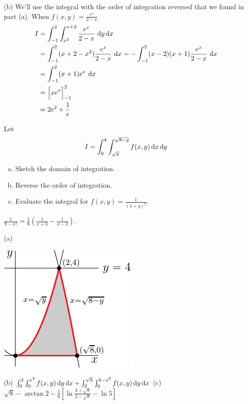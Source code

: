 \begin{solution}
(b) We'll use the integral with the order of integration reversed
that we found in part (a). When $f(x,y)=\frac{e^x}{2-x}$
\begin{align*}
I &= \int_{-1}^2\int_{x^2}^{x+2} \frac{e^x}{2-x}\ \mathrm{d}y\,\mathrm{d}x \\
  &= \int_{-1}^2 (x+2-x^2)\frac{e^x}{2-x}\ \mathrm{d}x 
   = -\int_{-1}^2 (x-2)(x+1)\frac{e^x}{2-x}\ \mathrm{d}x \\
  &= \int_{-1}^2 (x+1) e^x\ \mathrm{d}x \\
  &= \Big[xe^x\Big]_{-1}^2 \\
  &= 2e^2 + \frac{1}{e}
\end{align*}
\end{solution}

\begin{question}[M200 2012D] %
Let
\begin{equation*}
I=\int_0^4\int_{\sqrt{y}}^{\sqrt{8-y}} f(x,y)\,\mathrm{d}x\,\mathrm{d}y
\end{equation*}
\begin{enumerate}[(a)]
\item
Sketch the domain of integration.
\item
Reverse the order of integration.
\item
Evaluate the integral for $f(x,y)=\frac{1}{(1+y)^2}$.
\end{enumerate}
 
\end{question}

\begin{hint}
 $\frac{1}{9-x^2} =\frac{1}{6}\left(\frac{1}{x+3}-\frac{1}{x-3}\right)$.
\end{hint}

\begin{answer}
(a)
\begin{center}
     \includegraphics{fig/OE12D_7aa.pdf}
\end{center}

(b) $\int_0^2\int_0^{x^2} f(x,y)\,\mathrm{d}y\,\mathrm{d}x
+\int_2^{\sqrt{8}}\int_0^{8-x^2} f(x,y)\,\mathrm{d}y\,\mathrm{d}x$\qquad
(c) $\sqrt{8}-\arctan 2 -\frac{1}{6}\left[\ln\frac{3+\sqrt{8}}{3-\sqrt{8}}
                                       -\ln 5\right]$
\end{answer}

